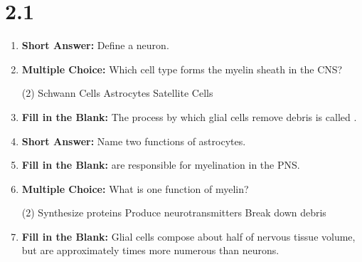 \section*{2.1}
\begin{enumerate}[label=\textbf{Q2.1.\arabic*}]
      \item \textbf{Short Answer:} Define a neuron. \\

      \item \textbf{Multiple Choice:} Which cell type forms the myelin sheath in the CNS?
            \begin{tasks}[label=\textcolor{draculafg}{(\Alph*)}, item-format=\color{draculafg}, label-width=1.5em, item-indent=1.7em](2)
                  \task  {}
                  \task Schwann Cells
                  \task Astrocytes
                  \task Satellite Cells
            \end{tasks}

      \item \textbf{Fill in the Blank:} The process by which glial cells remove debris is called . \\
      
      \item \textbf{Short Answer:} Name two functions of astrocytes. \\

      \item \textbf{Fill in the Blank:}  are responsible for myelination in the PNS. \\

      \item \textbf{Multiple Choice:} What is one function of myelin?
            \begin{tasks}[label=\textcolor{draculafg}{(\Alph*)}, item-format=\color{draculafg}, label-width=1.5em, item-indent=1.7em](2)
                  \task {}
                  \task Synthesize proteins
                  \task Produce neurotransmitters
                  \task Break down debris
            \end{tasks}

      \item \textbf{Fill in the Blank:} Glial cells compose about half of nervous tissue volume, but are approximately  times more numerous than neurons. \\


\end{enumerate}
